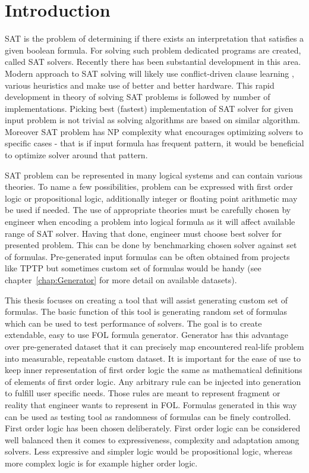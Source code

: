 \chapter{Introduction}
\label{cha:Introduction}

\gls{SAT} is the problem of determining if there exists an interpretation that satisfies a given boolean formula. For solving such problem dedicated programs are created, called SAT solvers. Recently there has been substantial development in this area. Modern approach to SAT solving will likely use conflict-driven clause learning \cite{series/faia/SilvaLM09}, various heuristics and make use of better and better hardware. This rapid development in theory of solving SAT problems is followed by number of implementations. Picking best (fastest) implementation of SAT solver for given input problem is not trivial as solving algorithms are based on similar algorithm. Moreover SAT problem has NP complexity what encourages optimizing solvers to specific cases - that is if input formula has frequent pattern, it would be beneficial to optimize solver around that pattern.

SAT problem can be represented in many logical systems and can contain various theories. To name a few possibilities, problem can be expressed with first order logic or propositional logic, additionally integer or floating point arithmetic may be used if needed. The use of appropriate theories must be carefully chosen by engineer when encoding a problem into logical formula as it will affect available range of SAT solver. Having that done, engineer must choose best solver for presented problem. This can be done by benchmarking chosen solver against set of formulas. Pre-generated input formulas can be often obtained from projects like \gls{TPTP} but sometimes custom set of formulas would be handy (see chapter~\ref{chap:Generator} for more detail on available datasets).

This thesis focuses on creating a tool that will assist generating custom set of formulas. The basic function of this tool is generating random set of formulas which can be used to test performance of solvers. 
The goal is to create extendable, easy to use \gls{FOL} formula generator.
Generator has this advantage over pre-generated dataset that it can precisely map encountered real-life problem into measurable, repeatable custom dataset. It is important for the ease of use to keep inner representation of first order logic the same as mathematical definitions of elements of first order logic. Any arbitrary rule can be injected into generation to fulfill user specific needs. Those rules are meant to represent fragment or reality that engineer wants to represent in \gls{FOL}. Formulas generated in this way can be used as testing tool as randomness of formulas can be finely controlled. 
First order logic has been chosen deliberately. First order logic can be considered well balanced then it comes to expressiveness, complexity and adaptation among solvers. Less expressive and simpler logic would be propositional logic, whereas more complex logic is for example higher order logic. 



